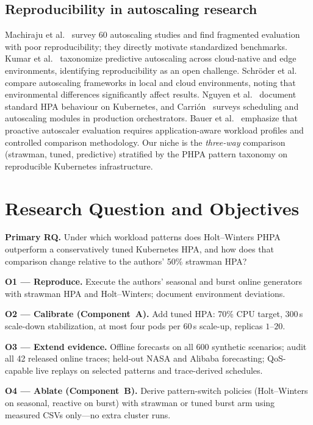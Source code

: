 \documentclass[journal]{IEEEtran}
\begin{document}
\subsection{Reproducibility in autoscaling research}
Machiraju et al.~\cite{mca2026} survey 60 autoscaling studies and find fragmented evaluation with poor reproducibility; they directly motivate standardized benchmarks. Kumar et al.~\cite{kumar2026} taxonomize predictive autoscaling across cloud-native and edge environments, identifying reproducibility as an open challenge. Schr\"oder et al.~\cite{schroder2023} compare autoscaling frameworks in local and cloud environments, noting that environmental differences significantly affect results. Nguyen et al.~\cite{nguyen2020} document standard HPA behaviour on Kubernetes, and Carri\'on~\cite{carrion2022} surveys scheduling and autoscaling modules in production orchestrators. Bauer et al.~\cite{bauer2017} emphasize that proactive autoscaler evaluation requires application-aware workload profiles and controlled comparison methodology. Our niche is the \emph{three-way} comparison (strawman, tuned, predictive) stratified by the PHPA pattern taxonomy on reproducible Kubernetes infrastructure.

\section{Research Question and Objectives}
\textbf{Primary RQ.} Under which workload patterns does Holt--Winters PHPA outperform a conservatively tuned Kubernetes HPA, and how does that comparison change relative to the authors' 50\% strawman HPA?

\textbf{O1 --- Reproduce.} Execute the authors' seasonal and burst online generators with strawman HPA and Holt--Winters; document environment deviations.

\textbf{O2 --- Calibrate (Component~A).} Add tuned HPA: 70\% CPU target, 300\,s scale-down stabilization, at most four pods per 60\,s scale-up, replicas $1$--$20$.

\textbf{O3 --- Extend evidence.} Offline forecasts on all 600 synthetic scenarios; audit all 42 released online traces; held-out NASA and Alibaba forecasting; QoS-capable live replays on selected patterns and trace-derived schedules.

\textbf{O4 --- Ablate (Component~B).} Derive pattern-switch policies (Holt--Winters on seasonal, reactive on burst) with strawman or tuned burst arm using measured CSVs only---no extra cluster runs.
\end{document}
